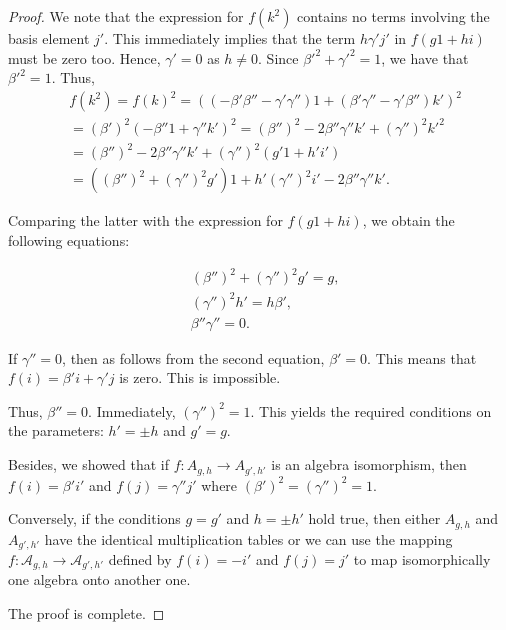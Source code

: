 \documentclass{amsart}
\theoremstyle{definition}
\theoremstyle{plain}
\begin{document}
\begin{proof}
We note that the expression for $f(k^2)$ contains no terms involving the basis element $j'$. This immediately implies that  the term $h \gamma' j'$ in $f(g1+hi)$ must be zero too. Hence, $\gamma'=0$ as $h\neq 0$. Since 
$\beta'^2 +\gamma'^2 = 1$, we have that $\beta'^2=1$. 
Thus, 
\begin{align*}
&f(k^2)= f(k)^2 =  ( (-\beta' \beta'' - \gamma'\gamma'') 1 + (\beta' \gamma'' - \gamma' \beta'') k' )^2\\
&= (\beta')^2 (-\beta'' 1 + \gamma'' k')^2 = (\beta'')^2 - 2 \beta''\gamma'' k' + (\gamma'' )^2 k'^2\\
&=  (\beta'')^2 - 2 \beta''\gamma'' k' + (\gamma'' )^2 (g' 1 + h' i')\\
& = ( ( \beta'')^2 + (\gamma'')^2 g')1 + h' (\gamma'')^2 i'  - 2 \beta''\gamma'' k'.
\end{align*}

Comparing the latter with the expression for  $f(g1+hi)$, we obtain the following equations:

\begin{align*}
 & (\beta'')^2 + (\gamma'')^2 g' = g, \tag{1}\\
 & (\gamma'')^2 h' = h\beta', \tag{2} \\
& \beta'' \gamma'' = 0. \tag{3}
\end{align*}

If $\gamma''=0$, then as follows from the second equation, $\beta'=0$. This means that $f(i) = \beta' i + \gamma' j$ is zero. This is impossible.

Thus, $\beta''=0$. Immediately, $(\gamma'')^2 = 1$.  This yields the required conditions on the parameters: $h' = \pm h$ and $g' =g$. 

Besides, we showed that if $f: A_{g, h}\to A_{g', h'}$ is an algebra isomorphism, then $f(i) = \beta' i'$ and $f(j)= \gamma'' j'$ where $(\beta')^2 = (\gamma'')^2 = 1.$


Conversely, if  the conditions  $g=g'$ and $h=\pm h'$ hold true, then either $A_{g, h}$ and $A_{g', h'}$ have the identical multiplication tables or we can use the mapping $f:\mathcal A_{g, h}\to \mathcal A_{g', h'}$
defined by $f(i)=-i'$ and $f(j)=j'$ to map isomorphically one algebra onto another one.

The proof is complete.

\end{proof}
\end{document}
